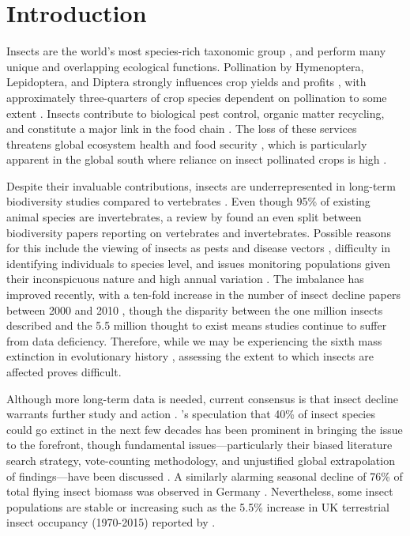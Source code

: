 \documentclass[11pt]{article}
\begin{document}
	\clearpage 
	
	\section{Introduction}
		Insects are the world’s most species-rich taxonomic group \citep{homburg2019have,cardoso2020scientists}, and perform many unique and overlapping ecological functions. Pollination by Hymenoptera, Lepidoptera, and Diptera strongly influences crop yields and profits \citep{habel2019mitigating}, with approximately three-quarters of crop species dependent on pollination to some extent \citep{klein2007importance}. Insects contribute to biological pest control, organic matter recycling, and constitute a major link in the food chain \citep{sanchez2019worldwide}. The loss of these services threatens global ecosystem health and food security \citep{potts2016safeguarding}, which is particularly apparent in the global south where reliance on insect pollinated crops is high \citep{dicks2021global}. 
		
		\noindent Despite their invaluable contributions, insects are underrepresented in long-term biodiversity studies compared to vertebrates \citep{outhwaite2020complex,wagner2021insect}. Even though 95\% of existing animal species are invertebrates, a review by \citet{titley2017scientific} found an even split between biodiversity papers reporting on vertebrates and invertebrates. Possible reasons for this include the viewing of insects as pests and disease vectors \citep{lawton1998biodiversity,milivcic2021insect}, difficulty in identifying individuals to species level, and issues monitoring populations given their inconspicuous nature and high annual variation \citep{fox2019insect}. The imbalance has improved recently, with a ten-fold increase in the number of insect decline papers between 2000 and 2010 \citep{eggleton2020state}, though the disparity between the one million insects described and the 5.5 million thought to exist \citep{stork2018many} means studies continue to suffer from data deficiency. Therefore, while we may be experiencing the sixth mass extinction in evolutionary history \citep{dirzo2014defaunation}, assessing the extent to which insects are affected proves difficult. 
		
		\noindent Although more long-term data is needed, current consensus is that insect decline warrants further study and action \citep{montgomery2020insect}. \citet{sanchez2019worldwide}'s speculation that 40\% of insect species could go extinct in the next few decades has been prominent in bringing the issue to the forefront, though fundamental issues—particularly their biased literature search strategy, vote-counting methodology, and unjustified global extrapolation of findings—have been discussed \citep{simmons2019worldwide,saunders2020moving}. A similarly alarming seasonal decline of 76\% of total flying insect biomass was observed in Germany \citep{hallmann2017more}. Nevertheless, some insect populations are stable or increasing \citep{boyes2019bucking,wagner2021insect} such as the 5.5\% increase in UK terrestrial insect occupancy (1970-2015) reported by \citet{outhwaite2020complex}. 
		
\end{document}
